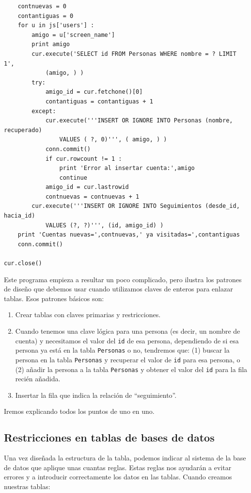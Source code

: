 \begin{verbatim}
    contnuevas = 0
    contantiguas = 0
    for u in js['users'] :
        amigo = u['screen_name']
        print amigo
        cur.execute('SELECT id FROM Personas WHERE nombre = ? LIMIT 1', 
            (amigo, ) )
        try:
            amigo_id = cur.fetchone()[0]
            contantiguas = contantiguas + 1
        except:
            cur.execute('''INSERT OR IGNORE INTO Personas (nombre, recuperado) 
                VALUES ( ?, 0)''', ( amigo, ) )
            conn.commit()
            if cur.rowcount != 1 :
                print 'Error al insertar cuenta:',amigo
                continue
            amigo_id = cur.lastrowid
            contnuevas = contnuevas + 1
        cur.execute('''INSERT OR IGNORE INTO Seguimientos (desde_id, hacia_id) 
            VALUES (?, ?)''', (id, amigo_id) )
    print 'Cuentas nuevas=',contnuevas,' ya visitadas=',contantiguas
    conn.commit()

cur.close()
\end{verbatim}
\afterverb
%
Este programa empieza a resultar un poco complicado, pero ilustra
los patrones de diseño que debemos usar cuando utilizamos
claves de enteros para enlazar tablas. Esos patrones básicos son:

\begin{enumerate}

\item Crear tablas con claves primarias y restricciones.

\item Cuando tenemos una clave lógica para una persona (es decir, un
nombre de cuenta) y necesitamos el valor del {\tt id} de esa persona,
dependiendo de si esa persona ya está en la tabla
{\tt Personas} o no, tendremos que:
(1) buscar la persona en la tabla {\tt Personas} y
recuperar el valor de {\tt id} para esa persona,
o (2) añadir la persona a la tabla {\tt Personas} y obtener el
valor del {\tt id} para la fila recién añadida.

\item Insertar la fila que indica la relación de ``seguimiento''.

\end{enumerate}

Iremos explicando todos los puntos de uno en uno.

\subsection{Restricciones en tablas de bases de datos}

Una vez diseñada la estructura de la tabla, podemos indicar al sistema
de la base de datos que aplique unas cuantas reglas. Estas reglas nos
ayudarán a evitar errores y a introducir correctamente los datos en
las tablas. Cuando creamos nuestras tablas:


